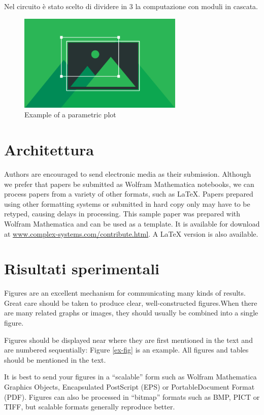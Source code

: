 \documentclass{article}
\begin{document}
Nel circuito è stato scelto di dividere in 3 la computazione con moduli in cascata.

\begin{figure}[h]
\centering
\includegraphics[width=0.7\textwidth]{introduzioneimg1.png}
\caption{Example of a parametric plot}
\end{figure}
\break

\section{Architettura}

Authors are encouraged to send electronic media as their submission. Although we prefer that papers be submitted as Wolfram Mathematica notebooks, we can process papers from a variety of other formats, such as LaTeX. Papers prepared using other formatting systems or submitted in hard copy only may have to be retyped, causing delays in processing. This sample paper was prepared with Wolfram Mathematica and can be used as a template. It is available for download at \url{www.complex-systems.com/contribute.html}. A LaTeX version is also available.

\section{Risultati sperimentali}

Figures are an excellent mechanism for communicating many kinds of results. Great care should be taken to produce clear, well-constructed figures.When there are many related graphs or images, they should usually be combined into a single figure. 

Figures should be displayed near where they are first mentioned in the text and are numbered sequentially: Figure \ref{ex-fig} is an example. All figures and tables should be mentioned in the text.

It is best to send your figures in a {``}scalable{''} form such as Wolfram Mathematica Graphics Objects, Encapsulated PostScript (EPS) or PortableDocument Format (PDF). Figures can also be processed in {``}bitmap{''} formats such as BMP, PICT or TIFF, but scalable formats generally reproduce better.
 
\end{document}
